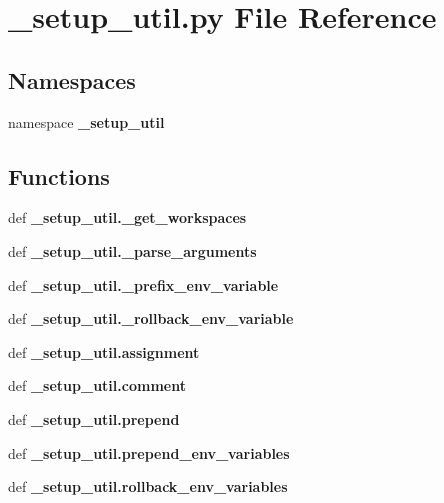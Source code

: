 \section{\-\_\-setup\-\_\-util.\-py \-File \-Reference}
\label{catkin__generated_2installspace_2__setup__util_8py}
\subsection*{\-Namespaces}
\begin{DoxyCompactItemize}
\item 
namespace {\bf \-\_\-setup\-\_\-util}
\end{DoxyCompactItemize}
\subsection*{\-Functions}
\begin{DoxyCompactItemize}
\item 
def {\bf \-\_\-setup\-\_\-util.\-\_\-get\-\_\-workspaces}
\item 
def {\bf \-\_\-setup\-\_\-util.\-\_\-parse\-\_\-arguments}
\item 
def {\bf \-\_\-setup\-\_\-util.\-\_\-prefix\-\_\-env\-\_\-variable}
\item 
def {\bf \-\_\-setup\-\_\-util.\-\_\-rollback\-\_\-env\-\_\-variable}
\item 
def {\bf \-\_\-setup\-\_\-util.\-assignment}
\item 
def {\bf \-\_\-setup\-\_\-util.\-comment}
\item 
def {\bf \-\_\-setup\-\_\-util.\-prepend}
\item 
def {\bf \-\_\-setup\-\_\-util.\-prepend\-\_\-env\-\_\-variables}
\item 
def {\bf \-\_\-setup\-\_\-util.\-rollback\-\_\-env\-\_\-variables}
\end{DoxyCompactItemize}
